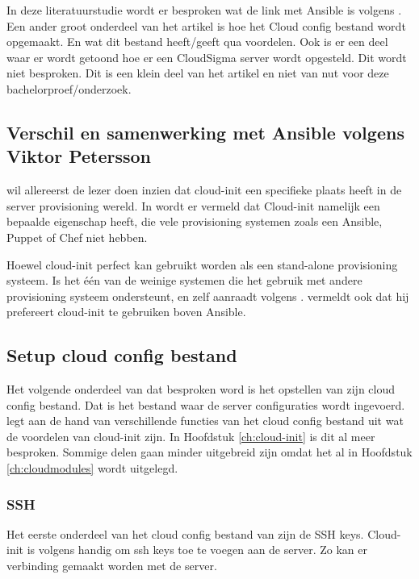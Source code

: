 In deze literatuurstudie wordt er besproken wat de link met Ansible is volgens \autocite{viktorpet}. Een ander groot onderdeel van het artikel is hoe het Cloud config bestand wordt opgemaakt. En wat dit bestand heeft/geeft qua voordelen. Ook is er een deel waar er wordt getoond hoe er een CloudSigma server wordt opgesteld. Dit wordt niet besproken. Dit is een klein deel van het artikel en niet van nut voor deze bachelorproef/onderzoek.

\newpage
\subsection{Verschil en samenwerking met Ansible volgens Viktor Petersson}
\autocite{viktorpet} wil allereerst de lezer doen inzien dat cloud-init een specifieke plaats heeft in de server provisioning wereld. In \autocite{viktorpet} wordt er vermeld dat Cloud-init namelijk een bepaalde eigenschap heeft, die vele provisioning systemen zoals een Ansible, Puppet of Chef niet hebben. 

Hoewel cloud-init perfect kan gebruikt worden als een stand-alone provisioning systeem. Is het één van de weinige systemen die het gebruik met andere provisioning systeem ondersteunt, en zelf aanraadt volgens \autocite{viktorpet}. \autocite{viktorpet} vermeldt ook dat hij prefereert cloud-init te gebruiken boven Ansible.

\subsection{Setup cloud config bestand}
Het volgende onderdeel van \autocite{viktorpet} dat besproken word is het opstellen van zijn cloud config bestand. Dat is het bestand waar de server configuraties wordt ingevoerd. \autocite{viktorpet} legt aan de hand van verschillende functies van het cloud config bestand uit wat de voordelen van cloud-init zijn. In Hoofdstuk \ref*{ch:cloud-init} is dit al meer besproken. Sommige delen gaan minder uitgebreid zijn omdat het al in Hoofdstuk \ref*{ch:cloudmodules} wordt uitgelegd.

\subsubsection{SSH}
Het eerste onderdeel van het cloud config bestand van \autocite{viktorpet} zijn de SSH keys. Cloud-init is volgens \autocite{viktorpet} handig om ssh keys toe te voegen aan de server. Zo kan er verbinding gemaakt worden met de server. 

